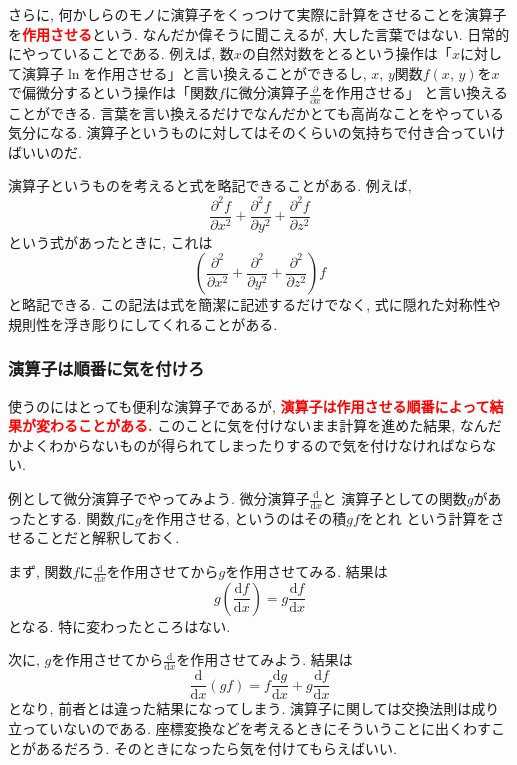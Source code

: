 さらに, 何かしらのモノに演算子をくっつけて実際に計算をさせることを演算子を\textbf{\textcolor{red}{作用させる}}という. 
なんだか偉そうに聞こえるが, 大した言葉ではない. 日常的にやっていることである. 
例えば, 数$x$の自然対数をとるという操作は「$x$に対して演算子$\ln$を作用させる」と言い換えることができるし, 
$x$, $y$関数$f(x, \, y)$を$x$で偏微分するという操作は「関数$f$に微分演算子$\displaystyle \frac{\partial}{\partial x}$を作用させる」
と言い換えることができる. 言葉を言い換えるだけでなんだかとても高尚なことをやっている気分になる. 
演算子というものに対してはそのくらいの気持ちで付き合っていけばいいのだ.  

演算子というものを考えると式を略記できることがある. 例えば, 
$$
\frac{\partial^2 f}{\partial x^2} + \frac{\partial^2 f}{\partial y^2} + \frac{\partial^2 f}{\partial z^2}
$$
という式があったときに, これは
$$
\left( \frac{\partial^2}{\partial x^2} + \frac{\partial^2}{\partial y^2} + \frac{\partial^2}{\partial z^2} \right) f
$$
と略記できる. この記法は式を簡潔に記述するだけでなく, 式に隠れた対称性や規則性を浮き彫りにしてくれることがある. 

\subsubsection{演算子は順番に気を付けろ}
使うのにはとっても便利な演算子であるが, \textbf{\textcolor{red}{演算子は作用させる順番によって結果が変わることがある.}}
このことに気を付けないまま計算を進めた結果, なんだかよくわからないものが得られてしまったりするので気を付けなければならない. 

例として微分演算子でやってみよう. 微分演算子$\displaystyle \frac{\mathrm{d}}{\mathrm{d}x}$と
演算子としての関数$g$があったとする. 関数$f$に$g$を作用させる, というのはその積$gf$をとれ
という計算をさせることだと解釈しておく. 

まず, 関数$f$に$\displaystyle \frac{\mathrm{d}}{\mathrm{d}x}$を作用させてから$g$を作用させてみる. 
結果は
$$
g \left( \frac{\mathrm{d}f}{\mathrm{d}x} \right)  = g \frac{\mathrm{d}f}{\mathrm{d}x}
$$
となる. 特に変わったところはない. 

次に, $g$を作用させてから$\displaystyle \frac{\mathrm{d}}{\mathrm{d}x}$を作用させてみよう. 
結果は
$$
\frac{\mathrm{d}}{\mathrm{d}x} (gf) = f \frac{\mathrm{d}g}{\mathrm{d}x} + g \frac{\mathrm{d}f}{\mathrm{d}x}
$$
となり, 前者とは違った結果になってしまう. 
演算子に関しては交換法則は成り立っていないのである. 
座標変換などを考えるときにそういうことに出くわすことがあるだろう. 
そのときになったら気を付けてもらえばいい. 

